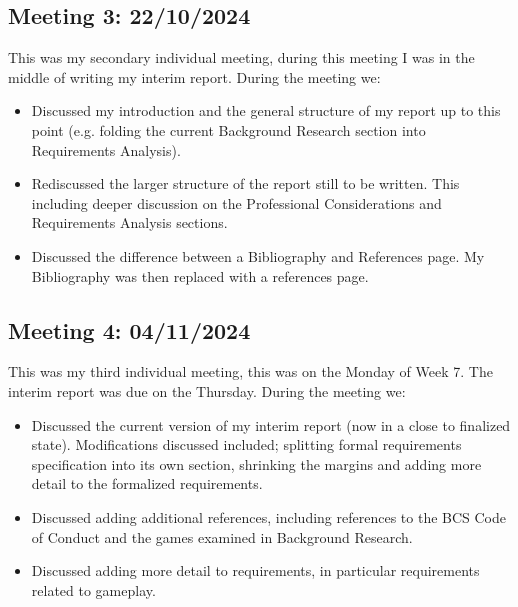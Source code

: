 \documentclass{report}
\begin{document}
\subsection{Meeting 3: 22/10/2024}

This was my secondary individual meeting, during this meeting I was in the middle of writing my interim report. During the meeting we:
\begin{itemize}
  \item Discussed my introduction and the general structure of my report up to this point (e.g. folding the current Background Research section into Requirements Analysis).
  \item Rediscussed the larger structure of the report still to be written. This including deeper discussion on the Professional Considerations and Requirements Analysis sections.
  \item Discussed the difference between a Bibliography and References page. My Bibliography was then replaced with a references page.
\end{itemize}

\subsection{Meeting 4: 04/11/2024}

This was my third individual meeting, this was on the Monday of Week 7. The interim report was due on the Thursday. During the meeting we:
\begin{itemize}
  \item Discussed the current version of my interim report (now in a close to finalized state). Modifications discussed included; splitting formal requirements specification into its own section, shrinking the margins and adding more detail to the formalized requirements.
  \item Discussed adding additional references, including references to the BCS Code of Conduct and the games examined in Background Research.
  \item Discussed adding more detail to requirements, in particular requirements related to gameplay.
\end{itemize}
\end{document}
